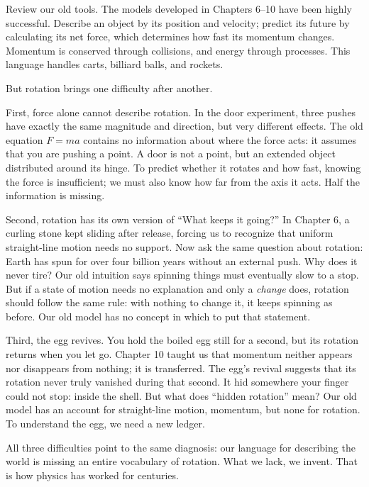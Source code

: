 
Review our old tools. The models developed in Chapters 6--10 have been highly successful. Describe an object by its position and velocity; predict its future by calculating its net force, which determines how fast its momentum changes. Momentum is conserved through collisions, and energy through processes. This language handles carts, billiard balls, and rockets.

But rotation brings one difficulty after another.

First, force alone cannot describe rotation. In the door experiment, three pushes have exactly the same magnitude and direction, but very different effects. The old equation \(F=ma\) contains no information about where the force acts: it assumes that you are pushing a point. A door is not a point, but an extended object distributed around its hinge. To predict whether it rotates and how fast, knowing the force is insufficient; we must also know how far from the axis it acts. Half the information is missing.

Second, rotation has its own version of ``What keeps it going?'' In Chapter 6, a curling stone kept sliding after release, forcing us to recognize that uniform straight-line motion needs no support. Now ask the same question about rotation: Earth has spun for over four billion years without an external push. Why does it never tire? Our old intuition says spinning things must eventually slow to a stop. But if a state of motion needs no explanation and only a \emph{change} does, rotation should follow the same rule: with nothing to change it, it keeps spinning as before. Our old model has no concept in which to put that statement.

Third, the egg revives. You hold the boiled egg still for a second, but its rotation returns when you let go. Chapter 10 taught us that momentum neither appears nor disappears from nothing; it is transferred. The egg's revival suggests that its rotation never truly vanished during that second. It hid somewhere your finger could not stop: inside the shell. But what does ``hidden rotation'' mean? Our old model has an account for straight-line motion, momentum, but none for rotation. To understand the egg, we need a new ledger.

All three difficulties point to the same diagnosis: our language for describing the world is missing an entire vocabulary of rotation. What we lack, we invent. That is how physics has worked for centuries.

